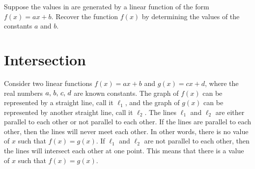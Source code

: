 \documentclass[a4paper,oneside,12pt]{article}
\begin{document}
\begin{table}[!htbp]
\centering

\caption{%
  Some values of a linear function $f(x) = ax + b$.
}
\label{tab:function_values_a_third_b_minus_4}
\end{table}

\begin{exercise}
Suppose the values in 
are generated by a linear function of the form $f(x) = ax + b$.
Recover the function $f(x)$ by determining the values of the constants
$a$ and $b$.
\end{exercise}



\section{Intersection}

Consider two linear functions $f(x) = ax + b$ and $g(x) = cx + d$,
where the real numbers ${a},\, {b},\, {c},\, {d}$ are known constants.
The graph of $f(x)$ can be represented by a straight line, call it
$\ell_1$, and the graph of $g(x)$ can be represented by another
straight line, call it $\ell_2$.  The lines $\ell_1$ and $\ell_2$ are
either parallel to each other or not parallel to each other.  If the
lines are parallel to each other, then the lines will never meet each
other.  In other words, there is no value of $x$ such that
$f(x) = g(x)$.  If $\ell_1$ and $\ell_2$ are not parallel to each
other, then the lines will intersect each other at one point.  This
means that there is a value of $x$ such that $f(x) = g(x)$.
\end{document}
